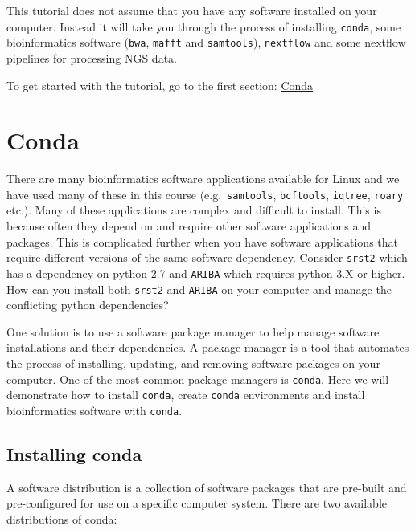 \documentclass[11pt]{article}
\begin{document}
This tutorial does not assume that you have any software installed on
your computer. Instead it will take you through the process of
installing \texttt{conda}, some bioinformatics software (\texttt{bwa},
\texttt{mafft} and \texttt{samtools}), \texttt{nextflow} and some
nextflow pipelines for processing NGS data.

    To get started with the tutorial, go to the first section:
\href{conda.ipynb}{Conda}





\newpage





    \hypertarget{conda}{%
\section{Conda}\label{conda}}

There are many bioinformatics software applications available for Linux
and we have used many of these in this course (e.g.~\texttt{samtools},
\texttt{bcftools}, \texttt{iqtree}, \texttt{roary} etc.). Many of these
applications are complex and difficult to install. This is because often
they depend on and require other software applications and packages.
This is complicated further when you have software applications that
require different versions of the same software dependency. Consider
\texttt{srst2} which has a dependency on python 2.7 and \texttt{ARIBA}
which requires python 3.X or higher. How can you install both
\texttt{srst2} and \texttt{ARIBA} on your computer and manage the
conflicting python dependencies?

One solution is to use a software package manager to help manage
software installations and their dependencies. A package manager is a
tool that automates the process of installing, updating, and removing
software packages on your computer. One of the most common package
managers is \texttt{conda}. Here we will demonstrate how to install
\texttt{conda}, create \texttt{conda} environments and install
bioinformatics software with \texttt{conda}.

    \hypertarget{installing-conda}{%
\subsection{Installing conda}\label{installing-conda}}

A software distribution is a collection of software packages that are
pre-built and pre-configured for use on a specific computer system.
There are two available distributions of conda:
\end{document}
